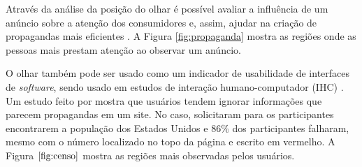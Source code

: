 Através da análise da posição do olhar é possível avaliar a influência de um anúncio sobre a atenção dos consumidores e, assim, ajudar na criação de propagandas mais eficientes \cite{duchowski2002breadth}. A Figura \ref{fig:propaganda} mostra as regiões onde as pessoas mais prestam atenção ao observar um anúncio.


O olhar também pode ser usado como um indicador de usabilidade de interfaces de \textit{software}, sendo usado em estudos de interação humano-computador (IHC) \cite{duchowski2002breadth}. Um estudo feito por \cite{nielsen2007fancy} mostra que usuários tendem  ignorar informações que parecem propagandas em um site. No caso, solicitaram para os participantes encontrarem a população dos Estados Unidos e $86\%$ dos participantes falharam, mesmo com o número localizado no topo da página e escrito em vermelho. A Figura $\ref{fig:censo}$ mostra as regiões mais observadas pelos usuários.


